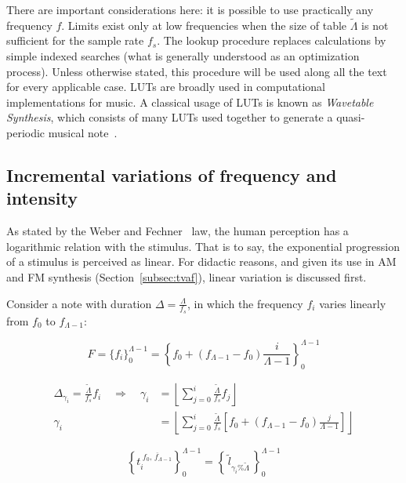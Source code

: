 There are important considerations here: it is possible to use practically any frequency $f$. Limits exist only at low frequencies when the size of table $\widetilde{\Lambda}$ is not sufficient for the sample rate $f_s$.
The lookup procedure replaces calculations by simple indexed searches (what is generally understood as an optimization process). Unless otherwise stated, this procedure will be used along all the text for every applicable case.
LUTs are broadly used in computational implementations for music. A classical usage of LUTs is known as \emph{Wavetable Synthesis}, which consists of many LUTs used together to generate a quasi-periodic musical note~\cite{Cook,Wavetable}.

\subsection{Incremental variations of frequency and intensity}\label{subsec:vars}
As stated by the Weber and Fechner~\cite{Weber-Fechner} law, the human perception has a logarithmic relation with the stimulus. That is to say, the exponential progression of a stimulus is perceived as linear.
For didactic reasons, and given its use in AM and FM synthesis (Section~\ref{subsec:tvaf}), linear variation is discussed first.

Consider a note with duration $\Delta = \frac{\Lambda}{f_s}$, in which the frequency $f_i$ varies linearly from $f_0$ to $f_{\Lambda -1}$:

\begin{equation}\label{freqLinear}
 F=\{f_i\}_0^{\Lambda-1}=\left\{f_0 + (f_{\Lambda-1}-f_0)\frac{i}{\Lambda-1} \right\}_0^{\Lambda-1}
\end{equation}

\begin{equation}\label{indiceLinear}
\begin{split}
	\Delta_{\gamma_i}=\frac{\widetilde{\Lambda}}{f_s}f_i \quad \Rightarrow \quad \gamma_i & = \left \lfloor \sum_{j=0}^{i} \frac{\widetilde{\Lambda}}{f_s}f_j \right \rfloor \\
	\gamma_i & =  \left \lfloor \sum_{j=0}^{i} \frac{\widetilde{\Lambda}}{f_s} \left [f_0 + (f_{\Lambda-1}-f_0)\frac{j}{\Lambda-1} \right ] \right \rfloor 
\end{split}
\end{equation}

\begin{equation}\label{serieAmostralLin}
 \left\{t_i^{\;\overline{f_0,\, f_{\Lambda-1}}}\right\}_0^{\Lambda-1}=\left\{\,\widetilde{l}_{\gamma_i \% \widetilde{\Lambda}}\,\right\}_0^{\Lambda-1}
\end{equation}


